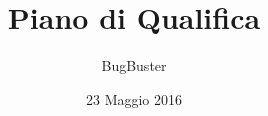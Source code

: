 



\title{\textbf{Piano di Qualifica}}
\author{BugBuster}

\date{23 Maggio 2016}




\makeFrontPage

\tableofcontents





